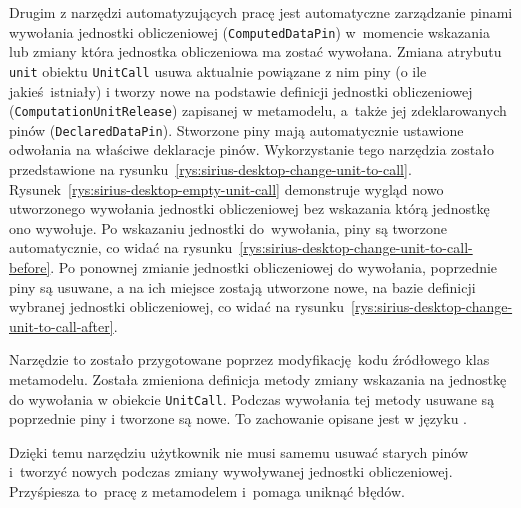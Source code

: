 Drugim z narzędzi automatyzujących pracę jest automatyczne zarządzanie
pinami wywołania jednostki obliczeniowej (\texttt{ComputedDataPin}) w~momencie
wskazania lub zmiany która jednostka obliczeniowa ma zostać wywołana. Zmiana
atrybutu \texttt{unit} obiektu \texttt{UnitCall} usuwa aktualnie powiązane z
nim piny (o ile jakieś istniały) i tworzy nowe na podstawie definicji jednostki
obliczeniowej (\texttt{ComputationUnitRelease}) zapisanej w metamodelu,
a~także jej zdeklarowanych pinów (\texttt{DeclaredDataPin}). Stworzone piny
mają
automatycznie ustawione odwołania na właściwe deklaracje pinów.
Wykorzystanie tego narzędzia zostało przedstawione na
rysunku~\ref{rys:sirius-desktop-change-unit-to-call}.
Rysunek~\ref{rys:sirius-desktop-empty-unit-call} demonstruje wygląd nowo
utworzonego wywołania jednostki obliczeniowej bez wskazania którą jednostkę ono
wywołuje. Po wskazaniu jednostki do~wywołania, piny są tworzone automatycznie,
co
widać na rysunku~\ref{rys:sirius-desktop-change-unit-to-call-before}. Po
ponownej zmianie jednostki obliczeniowej do wywołania, poprzednie piny są
usuwane, a na ich miejsce zostają utworzone nowe, na bazie definicji wybranej
jednostki obliczeniowej, co widać na
rysunku~\ref{rys:sirius-desktop-change-unit-to-call-after}.

Narzędzie to zostało przygotowane poprzez modyfikację kodu źródłowego klas
metamodelu. Została zmieniona definicja metody zmiany wskazania na jednostkę do
wywołania w obiekcie \texttt{UnitCall}. Podczas wywołania tej metody usuwane są
poprzednie piny i tworzone są nowe. To zachowanie opisane jest w języku
\Java{}.

Dzięki temu narzędziu użytkownik nie musi samemu usuwać starych pinów
i~tworzyć nowych podczas zmiany wywoływanej jednostki obliczeniowej.
Przyśpiesza to~pracę z
metamodelem i~pomaga uniknąć błędów.

